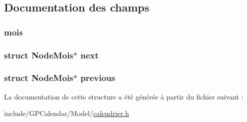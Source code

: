 \subsection{Documentation des champs}
\hypertarget{struct_node_mois_ab849c15d22d8cdd9c32d94bfc37033eb}{
\subsubsection[{mois}]{ mois}}\label{struct_node_mois_ab849c15d22d8cdd9c32d94bfc37033eb}
\hypertarget{struct_node_mois_a91a0a35c8966de2862bf897c1c914b3e}{
\subsubsection[{next}]{\setlength{\rightskip}{0pt plus 5cm}struct {\bf Node\-Mois}$\ast$ next}}\label{struct_node_mois_a91a0a35c8966de2862bf897c1c914b3e}
\hypertarget{struct_node_mois_a9c424087093e46294bf21e09595ca6e0}{
\subsubsection[{previous}]{\setlength{\rightskip}{0pt plus 5cm}struct {\bf Node\-Mois}$\ast$ previous}}\label{struct_node_mois_a9c424087093e46294bf21e09595ca6e0}


La documentation de cette structure a été générée à partir du fichier suivant \-:\begin{DoxyCompactItemize}
\item 
include/\-G\-P\-Calendar/\-Model/\hyperlink{calendrier_8h}{calendrier.\-h}\end{DoxyCompactItemize}
